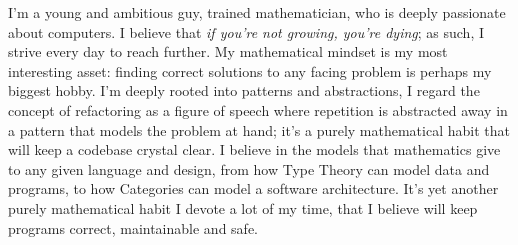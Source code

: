 

\begin{cvparagraph}
    
    I’m a young and ambitious guy, trained mathematician, who is deeply passionate about computers. I believe that \textit{if you're not growing, you're dying}; as such, I strive every day to reach further. My mathematical mindset is my most interesting asset: finding correct solutions to any facing problem is perhaps my biggest hobby. I'm deeply rooted into patterns and abstractions, I regard the concept of refactoring as a figure of speech where repetition is abstracted away in a pattern that models the problem at hand; it's a purely mathematical habit that will keep a codebase crystal clear. I believe in the models that mathematics give to any given language and design, from how Type Theory can model data and programs, to how Categories can model a software architecture. It's yet another purely mathematical habit I devote a lot of my time, that I believe will keep programs correct, maintainable and safe.
\end{cvparagraph}
